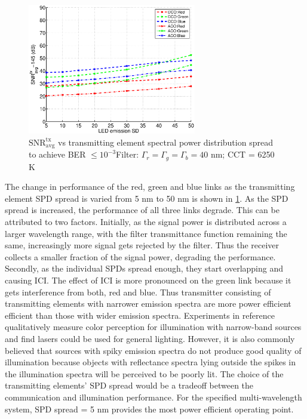 \begin{figure}[!b]
	\centering
		\includegraphics[trim={0.15in 0.05in 0.05in 0.35in}, clip=true, width=2.9in]{img/SNRvsLEDSD.eps}
	\caption{$\text{SNR}^{\text{tx}}_{\text{avg}}$ vs transmitting element spectral power distribution spread to achieve BER $\leq 10^{-3}$\newline Filter: $\Gamma_r = \Gamma_g = \Gamma_b = 40$ nm; CCT = 6250 K}
	\label{fig:SNRvsLEDSD}
\end{figure}

The change in performance of the red, green and blue links as the transmitting element SPD spread is varied from 5 nm to 50 nm is shown in \figurename{\ref{fig:SNRvsLEDSD}}. As the SPD spread is increased, the performance of all three links degrade. This can be attributed to two factors. Initially, as the signal power is distributed across a larger wavelength range, with the filter transmittance function remaining the same, increasingly more signal gets rejected by the filter. Thus the receiver collects a smaller fraction of the signal power, degrading the performance. Secondly, as the individual SPDs spread enough, they start overlapping and causing ICI. The effect of ICI is more pronounced on the green link because it gets interference from both, red and blue. Thus transmitter consisting of transmitting elements with narrower emission spectra are more power efficient efficient than those with wider emission spectra. Experiments in reference \cite{neu11a} qualitatively measure color perception for illumination with narrow-band sources and find lasers could be used for general lighting. However, it is also commonly believed that sources with spiky emission spectra do not produce good quality of illumination because objects with reflectance spectra lying outside the spikes in the illumination spectra will be perceived to be poorly lit. The choice of the transmitting elements' SPD spread would be a tradeoff between the communication and illumination performance. For the specified multi-wavelength system, SPD spread = 5 nm provides the most power efficient operating point.


